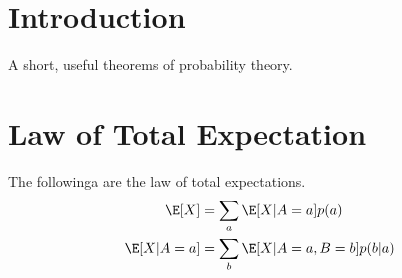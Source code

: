 \section{Introduction}
A short, useful theorems of probability theory.
\section{Law of Total Expectation}
The followinga are the law of total expectations.
\begin{align}
    \E[X]&=\sum_a\E[X|A=a]p(a)\\
    \E[X|A=a] &= \sum_b\E[X|A=a,B=b]p(b|a) \label{eq:cond-LTE}
\end{align}

